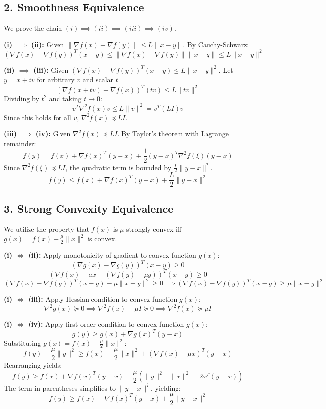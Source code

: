 \documentclass[12pt]{article}
\begin{document}
\subsection*{2. Smoothness Equivalence}
We prove the chain $(i) \implies (ii) \implies (iii) \implies (iv)$.

\textbf{(i) $\implies$ (ii):}
Given $\|\nabla f(x) - \nabla f(y)\| \le L\|x-y\|$. By Cauchy-Schwarz:
$$ (\nabla f(x) - \nabla f(y))^T(x-y) \le \|\nabla f(x) - \nabla f(y)\| \|x-y\| \le L\|x-y\|^2 $$

\textbf{(ii) $\implies$ (iii):}
Given $(\nabla f(x) - \nabla f(y))^T(x-y) \le L\|x-y\|^2$.
Let $y = x + tv$ for arbitrary $v$ and scalar $t$.
$$ (\nabla f(x+tv) - \nabla f(x))^T(tv) \le L\|tv\|^2 $$
Dividing by $t^2$ and taking $t \to 0$:
$$ v^T \nabla^2 f(x) v \le L\|v\|^2 = v^T (LI) v $$
Since this holds for all $v$, $\nabla^2 f(x) \preceq LI$.

\textbf{(iii) $\implies$ (iv):}
Given $\nabla^2 f(x) \preceq LI$. By Taylor's theorem with Lagrange remainder:
$$ f(y) = f(x) + \nabla f(x)^T(y-x) + \frac{1}{2}(y-x)^T \nabla^2 f(\xi) (y-x) $$
Since $\nabla^2 f(\xi) \preceq LI$, the quadratic term is bounded by $\frac{L}{2}\|y-x\|^2$.
$$ f(y) \le f(x) + \nabla f(x)^T(y-x) + \frac{L}{2}\|y-x\|^2 $$

\subsection*{3. Strong Convexity Equivalence}
We utilize the property that $f(x)$ is $\mu$-strongly convex iff $g(x) = f(x) - \frac{\mu}{2}\|x\|^2$ is convex.

\textbf{(i) $\iff$ (ii):}
Apply monotonicity of gradient to convex function $g(x)$:
$$ (\nabla g(x) - \nabla g(y))^T(x-y) \ge 0 $$
$$ (\nabla f(x) - \mu x - (\nabla f(y) - \mu y))^T(x-y) \ge 0 $$
$$ (\nabla f(x) - \nabla f(y))^T(x-y) - \mu\|x-y\|^2 \ge 0 \implies (\nabla f(x) - \nabla f(y))^T(x-y) \ge \mu\|x-y\|^2 $$

\textbf{(i) $\iff$ (iii):}
Apply Hessian condition to convex function $g(x)$:
$$ \nabla^2 g(x) \succeq 0 \implies \nabla^2 f(x) - \mu I \succeq 0 \implies \nabla^2 f(x) \succeq \mu I $$

\textbf{(i) $\iff$ (iv):}
Apply first-order condition to convex function $g(x)$:
$$ g(y) \ge g(x) + \nabla g(x)^T(y-x) $$
Substituting $g(x) = f(x) - \frac{\mu}{2}\|x\|^2$:
$$ f(y) - \frac{\mu}{2}\|y\|^2 \ge f(x) - \frac{\mu}{2}\|x\|^2 + (\nabla f(x) - \mu x)^T(y-x) $$
Rearranging yields:
$$ f(y) \ge f(x) + \nabla f(x)^T(y-x) + \frac{\mu}{2} \left( \|y\|^2 - \|x\|^2 - 2x^T(y-x) \right) $$
The term in parentheses simplifies to $\|y-x\|^2$, yielding:
$$ f(y) \ge f(x) + \nabla f(x)^T(y-x) + \frac{\mu}{2}\|y-x\|^2 $$
\end{document}
